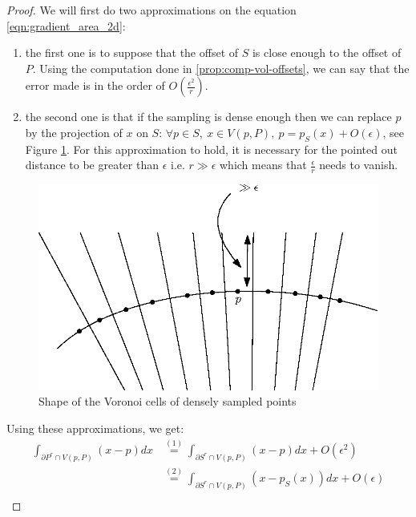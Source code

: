 \begin{proof}
We will first do two approximations on the equation \ref{eqn:gradient_area_2d}:
\begin{enumerate}
    \item the first one is to suppose that the offset of $ S $ is close enough
        to the offset of $ P $. Using the computation done in
        \ref{prop:comp-vol-offsets}, we can say that the error made is in the
        order of $ O(\frac{\epsilon^2}{r}) $.
    \item the second one is that if the sampling is dense enough then we can
        replace $ p $ by the projection of $ x $ on $ S $: $ \forall p \in S,~x
        \in V(p, P),~p = p_S(x) + O(\epsilon) $, see Figure
        \ref{fig:voronoi-cylinder}.  For this approximation to hold, it is
        necessary for the pointed out distance to be greater than $ \epsilon $
        i.e. $ r \gg \epsilon $ which means that $ \frac{\epsilon}{r} $ needs to
        vanish.
\end{enumerate}

\begin{figure}[h]
    \centering
    \includegraphics[scale=0.5]{img/voronoi-cylinder}
    \caption{Shape of the Voronoi cells of densely sampled points}
    \label{fig:voronoi-cylinder}
\end{figure}

Using these approximations, we get:
\begin{align*}
    \int_{\partial{P^r} \cap V(p, P)} (x - p) dx & \stackrel{(1)}{=} \int_{\partial{S^r} \cap V(p,
        P)} (x - p) dx + O(\epsilon^2) \\
    &\stackrel{(2)}{=} \int_{\partial{S^r} \cap V(p, P)} (x - p_S(x)) dx +
    O(\epsilon) \\
\end{align*}


\end{proof}
